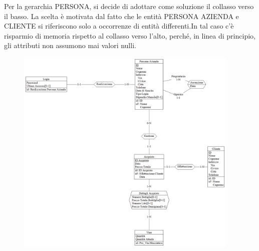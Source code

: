 \documentclass{article}
\begin{document}
\begin{itemize}
Per la gerarchia PERSONA, si decide di adottare come soluzione il collasso verso il basso. La scelta è motivata dal fatto che le entità PERSONA AZIENDA e CLIENTE si riferiscono solo a occorrenze di entità differenti.In tal caso c'è risparmio di memoria rispetto al collasso verso l'alto, perché, in linea di principio, gli attributi non assumono mai valori nulli.\\
\begin{figure}[htbp]
\centering
\includegraphics[width=0.95\textwidth]{img/eliminazione_ger_Persona.png}
\end{figure}\\\newline\newline
\newpage


\end{itemize}
\end{document}
